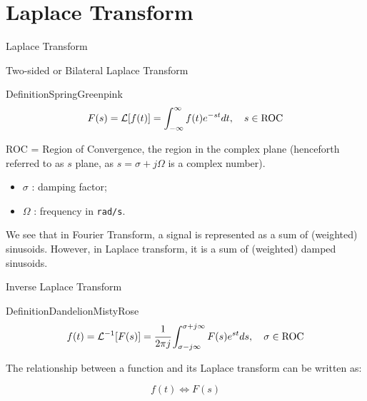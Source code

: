 \documentclass[aspectratio=169,xcolor=dvipsnames,svgnames,x11names,fleqn]{beamer}
\begin{document}
\section{Laplace Transform}


\begin{frame}{}
    \begin{center}
    \Huge \bf \color{DarkBlue}
   \faCertificate
    
    Laplace Transform

\end{center}
\end{frame}

\begin{frame}{Two-sided or Bilateral Laplace Transform}
    
    \small
    
\begin{custombox}{Definition}{SpringGreen}{pink}
\Large
\begin{equation}
    F(s) = {\mathcal L}[ f(t) ] = \int_{-\infty}^\infty f(t) e^{-st} dt, \quad s\in \textrm{ROC}
\end{equation}
\end{custombox}

ROC = Region of Convergence, the region in the complex plane (henceforth referred to as $s$ plane, as $s= \sigma + j\Omega$ is a complex number).

\begin{itemize}
    \item $\sigma $ : damping factor;
    \item $\Omega $ : frequency in \texttt{rad/s}.
\end{itemize}

\begin{tblock}{}
We see that in Fourier Transform, a signal is represented as a sum of (weighted) sinusoids. However, in Laplace transform, it is a sum of (weighted) damped sinusoids.
\end{tblock}
    
\end{frame}

\begin{frame}{Inverse Laplace Transform}
    \begin{custombox}{Definition}{Dandelion}{MistyRose}
    \Large
        \begin{equation}
            f(t) = {\mathcal L}^{-1}[F(s)] = \cfrac{1}{2\pi j}\int_{\sigma - j\infty}^{\sigma + j\infty} F(s)e^{st}ds, \quad \sigma \in \textrm{ROC}
        \end{equation}
    \end{custombox}
    The relationship between a function and its Laplace transform can be written as:
    \begin{center}
        \begin{equation}
            f(t) \iff F(s)
        \end{equation}
    \end{center}
    
\end{frame}
\end{document}
